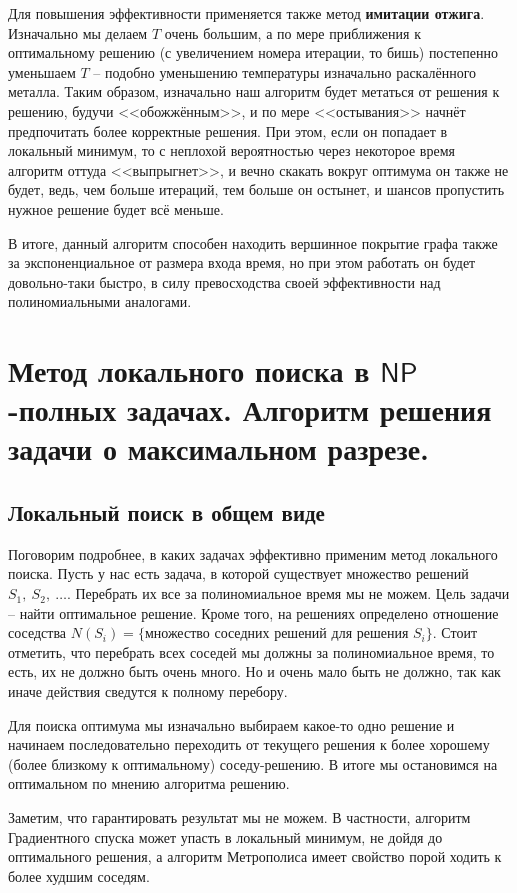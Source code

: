 \documentclass[a4paper,12pt]{article}
\newcommand{\NPclass}{\mathsf{NP}}
\begin{document}
Для повышения эффективности применяется также метод \textbf{имитации отжига}. Изначально мы делаем $T$ очень большим, а по мере приближения к оптимальному решению (с увеличением номера итерации, то бишь) постепенно уменьшаем $T$ -- подобно уменьшению температуры изначально раскалённого металла. Таким образом, изначально наш алгоритм будет метаться от решения к решению, будучи <<обожжённым>>, и по мере <<остывания>> начнёт предпочитать более корректные решения. При этом, если он попадает в локальный минимум, то с неплохой вероятностью через некоторое время алгоритм оттуда <<выпрыгнет>>, и вечно скакать вокруг оптимума он также не будет, ведь, чем больше итераций, тем больше он остынет, и шансов пропустить нужное решение будет всё меньше.

В итоге, данный алгоритм способен находить вершинное покрытие графа также за экспоненциальное от размера входа время, но при этом работать он будет довольно-таки быстро, в силу превосходства своей эффективности над полиномиальными аналогами.

\newpage
\section{Метод локального поиска в \(\NPclass\)-полных задачах. Алгоритм решения задачи о максимальном разрезе.}

\subsection{Локальный поиск в общем виде}

Поговорим подробнее, в каких задачах эффективно применим метод локального поиска. Пусть у нас есть задача, в которой существует множество решений $S_1,\ S_2,\ \ldots$. Перебрать их все за полиномиальное время мы не можем. Цель задачи -- найти оптимальное решение. Кроме того, на решениях определено отношение соседства $N(S_i) = \{\text{множество соседних решений}$ $\text{для решения }S_i\}$. Стоит отметить, что перебрать всех соседей мы должны за полиномиальное время, то есть, их не должно быть очень много. Но и очень мало быть не должно, так как иначе действия сведутся к полному перебору. 

Для поиска оптимума мы изначально выбираем какое-то одно решение и начинаем последовательно переходить от текущего решения к более хорошему (более близкому к оптимальному) соседу-решению. В итоге мы остановимся на оптимальном по мнению алгоритма решению.

Заметим, что гарантировать результат мы не можем. В частности, алгоритм Градиентного спуска может упасть в локальный минимум, не дойдя до оптимального решения, а алгоритм Метрополиса имеет свойство порой ходить к более худшим соседям.
\end{document}
